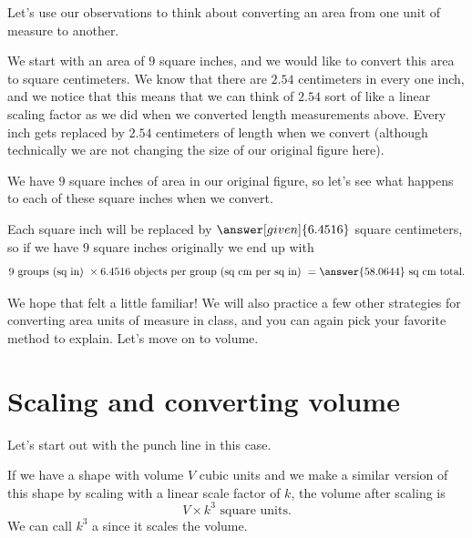 \documentclass{ximera}
\begin{document}
Let's use our observations to think about converting an area from one unit of measure to another.
\begin{example}
We start with an area of $9$ square inches, and we would like to convert this area to square centimeters. We know that there are $2.54$ centimeters in every one inch, and we notice that this means that we can think of $2.54$ sort of like a linear scaling factor as we did when we converted length measurements above. Every inch gets replaced by $2.54$ centimeters of length when we convert (although technically we are not changing the size of our original figure here).

We have $9$ square inches of area in our original figure, so let's see what happens to each of these square inches when we convert.
\begin{image}
\end{image}
Each square inch will be replaced by $\answer[given]{6.4516}$ square centimeters, so if we have $9$ square inches originally we end up with
\[
9 \textrm{ groups (sq in) } \times 6.4516 \textrm{ objects per group (sq cm per sq in) } = \answer{58.0644} \textrm{ sq cm total.}
\]




\end{example}
We hope that felt a little familiar! We will also practice a few other strategies for converting area units of measure in class, and you can again pick your favorite method to explain. Let's move on to volume.




\section{Scaling and converting volume}

Let's start out with the punch line in this case.
\begin{theorem}
If we have a shape with volume $V$ cubic units and we make a similar version of this shape by scaling with a linear scale factor of $k$, the volume after scaling is
\[
V \times k^3 \textrm{ square units.}
\]
We can call $k^3$ a  since it scales the volume.

\end{theorem}
\end{document}
